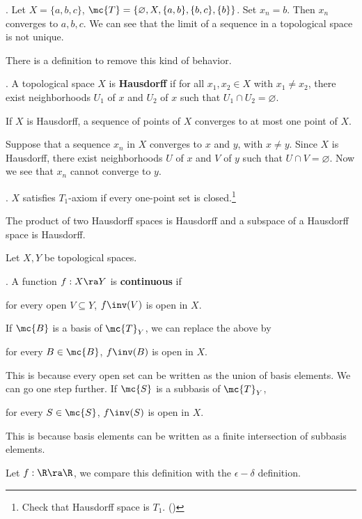 \ex. Let \(X = \{a, b, c\}\), \(\mc{T} = \{\varnothing, X, \{a, b\}, \{b, c\}, \{b\}\}\). Set \(x_n = b\). Then \(x_n\) converges to \(a, b, c\). We can see that the limit of a sequence in a topological space is not unique.

There is a definition to remove this kind of behavior.

.  A topological space \(X\) is \textbf{Hausdorff} if for all \(x_1, x_2 \in X\) with \(x_1 \neq x_2\), there exist neighborhoods \(U_1\) of \(x\) and \(U_2\) of \(x\) such that \(U_1 \cap U_2 = \varnothing\).

 If \(X\) is Hausdorff, a sequence of points of \(X\) converges to at most one point of \(X\).

\pf Suppose that a sequence \(x_n\) in \(X\) converges to \(x\) and \(y\), with \(x \neq y\). Since \(X\) is Hausdorff, there exist neighborhoods \(U\) of \(x\) and \(V\) of \(y\) such that \(U \cap V = \varnothing\). Now we see that \(x_n\) cannot converge to \(y\).

. \(X\) satisfies \(T_1\)-axiom if every one-point set is closed.\footnote{Check that Hausdorff space is \(T_1\). ()}

 The product of two Hausdorff spaces is Hausdorff and a subspace of a Hausdorff space is Hausdorff.


Let \(X, Y\) be topological spaces.

.  A function \(f : X \ra Y\) is \textbf{continuous} if
\begin{center}
    for every open \(V \subseteq Y\), \(f\inv(V)\) is open in \(X\).
\end{center}

\rmk If \(\mc{B}\) is a basis of \(\mc{T}_Y\), we can replace the above by
\begin{center}
    for every \(B \in \mc{B}\), \(f\inv(B)\) is open in \(X\).
\end{center}
This is because every open set can be written as the union of basis elements. We can go one step further. If \(\mc{S}\) is a subbasis of \(\mc{T}_Y\),
\begin{center}
    for every \(S \in \mc{S}\), \(f\inv(S)\) is open in \(X\).
\end{center}
This is because basis elements can be written as a finite intersection of subbasis elements.

\rmk Let \(f : \R \ra \R\), we compare this definition with the \(\epsilon-\delta\) definition.

